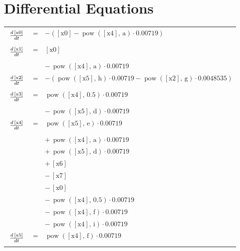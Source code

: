 \documentclass{article}
\begin{document}
\section*{Differential Equations}
\providecommand{\tabfrac}[2]{%
   \setlength{\fboxrule}{0pt}%
   \fbox{$\frac{#1}{#2}$}}
\begin{longtable}{lll}
$ \tabfrac{d\,\left[\mathrm{x0}\right]}{dt} $ &=& $ -\left(\left[\mathrm{x0}\right] - \operatorname{pow}\left(\left[\mathrm{x4}\right],\,\mathrm{a}\right) \cdot 0.00719\right) $\\[5mm]
$ \tabfrac{d\,\left[\mathrm{x1}\right]}{dt} $ &=& $ \left[\mathrm{x0}\right] $\\
 & & $ - \, \operatorname{pow}\left(\left[\mathrm{x4}\right],\,\mathrm{a}\right) \cdot 0.00719 $\\[5mm]
$ \tabfrac{d\,\left[\mathrm{x2}\right]}{dt} $ &=& $ -\left(\operatorname{pow}\left(\left[\mathrm{x5}\right],\,\mathrm{h}\right) \cdot 0.00719 - \operatorname{pow}\left(\left[\mathrm{x2}\right],\,\mathrm{g}\right) \cdot 0.0048535\right) $\\[5mm]
$ \tabfrac{d\,\left[\mathrm{x3}\right]}{dt} $ &=& $ \operatorname{pow}\left(\left[\mathrm{x4}\right],\,0.5\right) \cdot 0.00719 $\\
 & & $ - \, \operatorname{pow}\left(\left[\mathrm{x5}\right],\,\mathrm{d}\right) \cdot 0.00719 $\\[5mm]
$ \tabfrac{d\,\left[\mathrm{x4}\right]}{dt} $ &=& $ \operatorname{pow}\left(\left[\mathrm{x5}\right],\,\mathrm{e}\right) \cdot 0.00719 $\\
 & & $ + \, \operatorname{pow}\left(\left[\mathrm{x4}\right],\,\mathrm{a}\right) \cdot 0.00719 $\\
 & & $ + \, \operatorname{pow}\left(\left[\mathrm{x5}\right],\,\mathrm{d}\right) \cdot 0.00719 $\\
 & & $ + \, \left[\mathrm{x6}\right] $\\
 & & $ - \, \left[\mathrm{x7}\right] $\\
 & & $ - \, \left[\mathrm{x0}\right] $\\
 & & $ - \, \operatorname{pow}\left(\left[\mathrm{x4}\right],\,0.5\right) \cdot 0.00719 $\\
 & & $ - \, \operatorname{pow}\left(\left[\mathrm{x4}\right],\,\mathrm{f}\right) \cdot 0.00719 $\\
 & & $ - \, \operatorname{pow}\left(\left[\mathrm{x4}\right],\,\mathrm{i}\right) \cdot 0.00719 $\\[5mm]
$ \tabfrac{d\,\left[\mathrm{x5}\right]}{dt} $ &=& $ \operatorname{pow}\left(\left[\mathrm{x4}\right],\,\mathrm{f}\right) \cdot 0.00719 $\\

\end{longtable}
\end{document}
